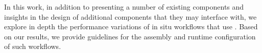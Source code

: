 In this work, in addition to presenting a number of existing \sys components and insights in the design of additional components that they may interface with, we explore in depth the performance variations of in situ workflows that use \sys. Based on our results, we provide guidelines for the assembly and runtime configuration of such workflows.

